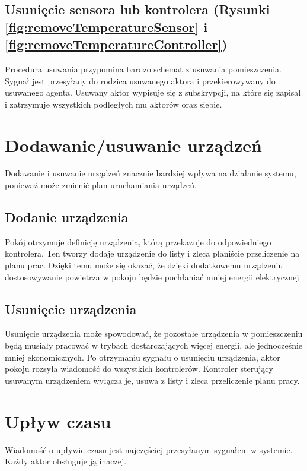 


\subsection*{Usunięcie sensora lub kontrolera (Rysunki \ref{fig:removeTemperatureSensor} i \ref{fig:removeTemperatureController})}
Procedura usuwania przypomina bardzo schemat z usuwania pomieszczenia. Sygnał jest przesyłany do rodzica usuwanego aktora i przekierowywany do usuwanego agenta. Usuwany aktor wypisuje się z subskrypcji, na które się zapisał i zatrzymuje wszystkich podległych mu aktorów oraz siebie.



\section{Dodawanie/usuwanie urządzeń}
Dodawanie i usuwanie urządzeń znacznie bardziej wpływa na działanie systemu, ponieważ może zmienić plan uruchamiania urządzeń. 

\subsection*{Dodanie urządzenia }
Pokój otrzymuje definicję urządzenia, którą przekazuje do odpowiedniego kontrolera. Ten tworzy dodaje urządzenie do listy i zleca planiście przeliczenie na planu prac. Dzięki temu może się okazać, że dzięki dodatkowemu urządzeniu dostosowywanie powietrza w pokoju będzie pochłaniać mniej energii elektrycznej.


\subsection*{Usunięcie urządzenia }
Usunięcie urządzenia może spowodować, że pozostałe urządzenia w pomieszczeniu będą musiały pracować w trybach dostarczających więcej energii, ale jednocześnie mniej ekonomicznych. 
Po otrzymaniu sygnału o usunięciu urządzenia, aktor pokoju rozsyła wiadomość do wszystkich kontrolerów. Kontroler sterujący usuwanym urządzeniem wyłącza je, usuwa z listy i zleca przeliczenie planu pracy.


\section{Upływ czasu}
Wiadomość o upływie czasu jest najczęściej przesyłanym sygnałem w systemie. Każdy aktor obsługuje ją inaczej. 

